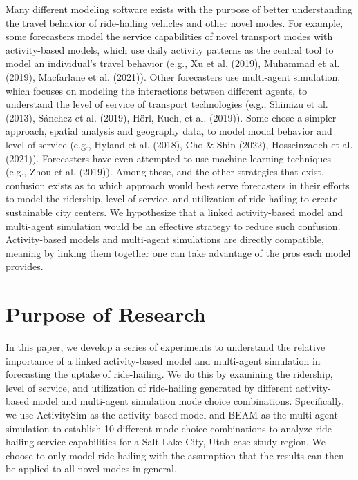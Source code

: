\documentclass[fancy, masters]{byuthesis}
\begin{document}
Many different modeling software exists with the purpose of better understanding the travel behavior of ride-hailing vehicles and other novel modes. For example, some forecasters model the service capabilities of novel transport modes with activity-based models, which use daily activity patterns as the central tool to model an individual's travel behavior (e.g., Xu et al. (2019), Muhammad et al. (2019), Macfarlane et al. (2021)). Other forecasters use multi-agent simulation, which focuses on modeling the interactions between different agents, to understand the level of service of transport technologies (e.g., Shimizu et al. (2013), Sánchez et al. (2019), Hörl, Ruch, et al. (2019)). Some chose a simpler approach, spatial analysis and geography data, to model modal behavior and level of service (e.g., Hyland et al. (2018), Cho \& Shin (2022), Hosseinzadeh et al. (2021)). Forecasters have even attempted to use machine learning techniques (e.g., Zhou et al. (2019)). Among these, and the other strategies that exist, confusion exists as to which approach would best serve forecasters in their efforts to model the ridership, level of service, and utilization of ride-hailing to create sustainable city centers. We hypothesize that a linked activity-based model and multi-agent simulation would be an effective strategy to reduce such confusion. Activity-based models and multi-agent simulations are directly compatible, meaning by linking them together one can take advantage of the pros each model provides.

\hypertarget{purpose-of-research}{%
\section{Purpose of Research}\label{purpose-of-research}}

In this paper, we develop a series of experiments to understand the relative importance of a linked activity-based model and multi-agent simulation in forecasting the uptake of ride-hailing. We do this by examining the ridership, level of service, and utilization of ride-hailing generated by different activity-based model and multi-agent simulation mode choice combinations. Specifically, we use ActivitySim as the activity-based model and BEAM as the multi-agent simulation to establish 10 different mode choice combinations to analyze ride-hailing service capabilities for a Salt Lake City, Utah case study region. We choose to only model ride-hailing with the assumption that the results can then be applied to all novel modes in general.
\end{document}
